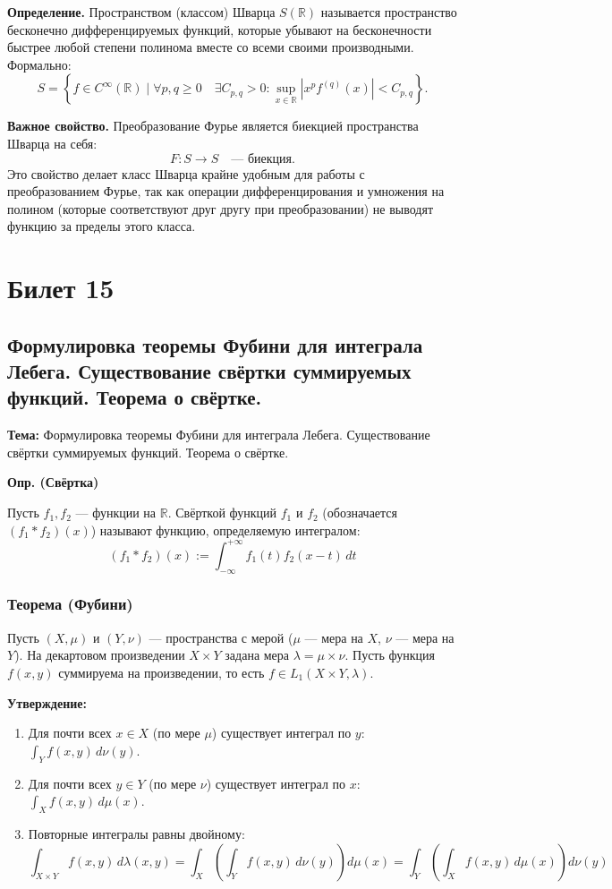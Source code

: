 \documentclass[12pt,a4paper,openany]{book}
\begin{document}
\textbf{Определение.} Пространством (классом) Шварца $S(\mathbb{R})$ называется пространство бесконечно дифференцируемых функций, которые убывают на бесконечности быстрее любой степени полинома вместе со всеми своими производными.
Формально:
\[
S = \left\{ f \in C^\infty(\mathbb{R}) \mid \forall p, q \ge 0 \quad \exists C_{p,q} > 0 : \sup_{x \in \mathbb{R}} \left| x^p f^{(q)}(x) \right| < C_{p,q} \right\}.
\]

\textbf{Важное свойство.} Преобразование Фурье является биекцией пространства Шварца на себя:
\[
F: S \to S \quad \text{— биекция}.
\]
Это свойство делает класс Шварца крайне удобным для работы с преобразованием Фурье, так как операции дифференцирования и умножения на полином (которые соответствуют друг другу при преобразовании) не выводят функцию за пределы этого класса.
\chapter{Билет 15}
\section{Формулировка теоремы Фубини для интеграла Лебега. Существование свёртки суммируемых функций. Теорема
о свёртке.}
\textbf{Тема:} Формулировка теоремы Фубини для интеграла Лебега. Существование свёртки суммируемых функций. Теорема о свёртке.

\bigskip

\textbf{Опр. (Свёртка)}

Пусть $f_1, f_2$ — функции на $\mathbb{R}$. Свёрткой функций $f_1$ и $f_2$ (обозначается $(f_1 * f_2)(x)$) называют функцию, определяемую интегралом:
$$
(f_1 * f_2)(x) := \int_{-\infty}^{+\infty} f_1(t) f_2(x-t) \, dt
$$

\hrulefill

\bigskip

\subsection{Теорема (Фубини)}

Пусть $(X, \mu)$ и $(Y, \nu)$ — пространства с мерой ($\mu$ — мера на $X$, $\nu$ — мера на $Y$). На декартовом произведении $X \times Y$ задана мера $\lambda = \mu \times \nu$.
Пусть функция $f(x, y)$ суммируема на произведении, то есть $f \in L_1(X \times Y, \lambda)$.

\textbf{Утверждение:}
\begin{enumerate}
    \item Для почти всех $x \in X$ (по мере $\mu$) существует интеграл по $y$: $\displaystyle \int_Y f(x, y) \, d\nu(y)$.
    \item Для почти всех $y \in Y$ (по мере $\nu$) существует интеграл по $x$: $\displaystyle \int_X f(x, y) \, d\mu(x)$.
    \item Повторные интегралы равны двойному:
    $$
    \int_{X \times Y} f(x, y) \, d\lambda(x, y) = \int_X \left( \int_Y f(x, y) \, d\nu(y) \right) d\mu(x) = \int_Y \left( \int_X f(x, y) \, d\mu(x) \right) d\nu(y)
    $$
\end{enumerate}
\end{document}
